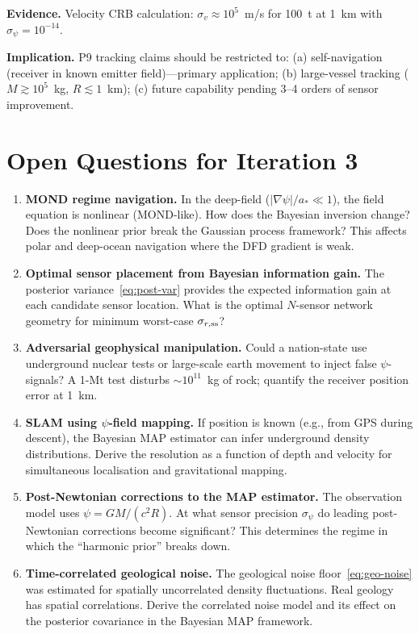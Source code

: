\documentclass[aps,prd,twocolumn,superscriptaddress,nofootinbib]{revtex4-2}
\newcommand{\astar}{a_*}
\begin{document}
\textbf{Evidence.} Velocity CRB calculation: $\sigma_v \approx 10^5$~m/s
for 100~t at 1~km with $\sigma_\psi = 10^{-14}$.

\textbf{Implication.} P9 tracking claims should be restricted to:
(a) self-navigation (receiver in known emitter field)---primary application;
(b) large-vessel tracking ($M \gtrsim 10^5$~kg, $R \lesssim 1$~km);
(c) future capability pending 3--4 orders of sensor improvement.

\section{Open Questions for Iteration 3}
\label{sec:open}

\begin{enumerate}
\item \textbf{MOND regime navigation.}  In the deep-field
  ($|\nabla\psi|/\astar \ll 1$), the field equation is nonlinear
  (MOND-like).  How does the Bayesian inversion change?  Does the
  nonlinear prior break the Gaussian process framework?  This affects
  polar and deep-ocean navigation where the DFD gradient is weak.

\item \textbf{Optimal sensor placement from Bayesian information gain.}
  The posterior variance~\eqref{eq:post-var} provides the expected
  information gain at each candidate sensor location.  What is the
  optimal $N$-sensor network geometry for minimum worst-case
  $\sigma_{r,\rm ss}$?

\item \textbf{Adversarial geophysical manipulation.}  Could a
  nation-state use underground nuclear tests or large-scale earth
  movement to inject false $\psi$-signals?  A 1-Mt test disturbs
  $\sim 10^{11}$~kg of rock; quantify the receiver position error
  at 1~km.

\item \textbf{SLAM using $\psi$-field mapping.}  If position is known
  (e.g., from GPS during descent), the Bayesian MAP estimator can
  infer underground density distributions.  Derive the resolution as
  a function of depth and velocity for simultaneous localisation and
  gravitational mapping.

\item \textbf{Post-Newtonian corrections to the MAP estimator.}  The
  observation model uses $\psi = GM/(c^2 R)$.  At what sensor precision
  $\sigma_\psi$ do leading post-Newtonian corrections become significant?
  This determines the regime in which the ``harmonic prior'' breaks down.

\item \textbf{Time-correlated geological noise.}  The geological noise
  floor~\eqref{eq:geo-noise} was estimated for spatially uncorrelated
  density fluctuations.  Real geology has spatial correlations.  Derive
  the correlated noise model and its effect on the posterior covariance
  in the Bayesian MAP framework.
\end{enumerate}
\end{document}
